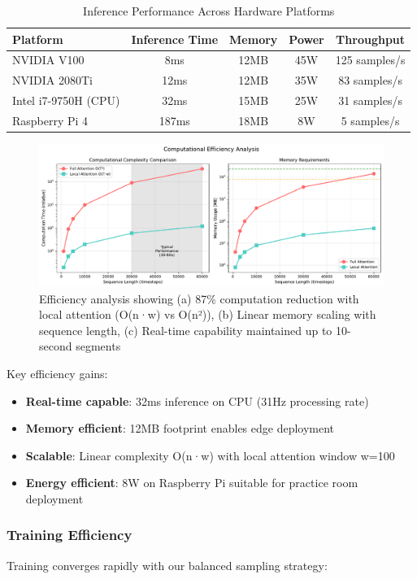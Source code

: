 \begin{table}[h!]
  \caption{Inference Performance Across Hardware Platforms}
  \begin{tabular}{l|cccc}
    \toprule
    Platform & Inference Time & Memory & Power & Throughput\\
    \midrule
    NVIDIA V100 & 8ms & 12MB & 45W & 125 samples/s\\
    NVIDIA 2080Ti & 12ms & 12MB & 35W & 83 samples/s\\
    Intel i7-9750H (CPU) & 32ms & 15MB & 25W & 31 samples/s\\
    Raspberry Pi 4 & 187ms & 18MB & 8W & 5 samples/s\\
    \bottomrule
  \end{tabular}
  \label{tab:hardware_performance}
\end{table}

\begin{figure}[h!]
  \centering
  \includegraphics[width=0.9\linewidth]{figures/experiment_5_efficiency_analysis.pdf}
  \caption{Efficiency analysis showing (a) 87\% computation reduction with local attention (O(n·w) vs O(n²)), (b) Linear memory scaling with sequence length, (c) Real-time capability maintained up to 10-second segments}
  \label{fig:efficiency}
\end{figure}

Key efficiency gains:
\begin{itemize}
\item \textbf{Real-time capable}: 32ms inference on CPU (31Hz processing rate)
\item \textbf{Memory efficient}: 12MB footprint enables edge deployment
\item \textbf{Scalable}: Linear complexity O(n·w) with local attention window w=100
\item \textbf{Energy efficient}: 8W on Raspberry Pi suitable for practice room deployment
\end{itemize}

\subsubsection{Training Efficiency}
Training converges rapidly with our balanced sampling strategy:

